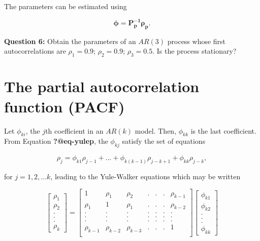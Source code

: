 \documentclass[
  11pt,
  a4paper,
]{report}
\begin{document}
The parameters can be estimated using

\[\bm{\phi}=\bm{P_p^{-1}\rho_p}.\]

\textbf{Question 6:} Obtain the parameters of an \(AR(3)\) process whose
first autocorrelations are \(\rho_1=0.9\); \(\rho_2=0.9\);
\(\rho_3=0.5\). Is the process stationary?

\section{The partial autocorrelation function
(PACF)}\label{the-partial-autocorrelation-function-pacf}

Let \(\phi_{ki}\), the \(j\)th coefficient in an \(AR(k)\) model. Then,
\(\phi_{kk}\) is the last coefficient. From Equation
\textbf{?@eq-yulep}, the \(\phi_{kj}\) satisfy the set of equations

\begin{equation}
\rho_j=\phi_{k1}\rho_{j-1}+...+\phi_{k(k-1)}\rho_{j-k+1}+\phi_{kk}\rho_{j-k},
\end{equation}

for \(j=1, 2, ...k\), leading to the Yule-Walker equations which may be
written

\begin{equation}
\left[\begin{array}
{r}
\rho_1  \\
\rho_2  \\
.\\
.\\
.\\
\rho_k
\end{array}\right] = \left[\begin{array}
{rrrrrrr}
1 & \rho_1 & \rho_2 & .&.&.& \rho_{k-1} \\
\rho_1 & 1 & \rho_1 & .&.&.& \rho_{k-2} \\
. & . & . & .&.&.& . \\
. & . & . & .&.&.& . \\
. & . & . & .&.&.& . \\
\rho_{k-1} & \rho_{k-2} & \rho_{k-3} & .&.&.& 1 \\
\end{array}\right] \left[\begin{array}
{r}
\phi_{k1}  \\
\phi_{k2}  \\
.\\
.\\
.\\
\phi_{kk}
\end{array}\right]
\end{equation}
\end{document}
